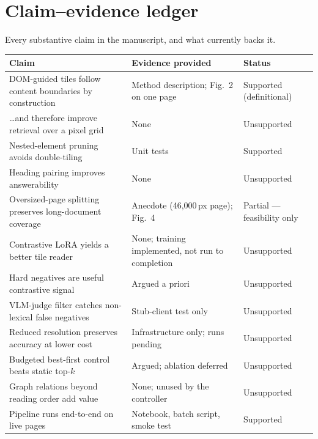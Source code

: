 \documentclass[11pt,a4paper]{article}
\begin{document}
\section{Claim--evidence ledger}

Every substantive claim in the manuscript, and what currently backs it.

\begin{center}
\small
\begin{longtable}{@{}L{7.1cm}L{4.1cm}L{4.4cm}@{}}
\toprule
\textbf{Claim} & \textbf{Evidence provided} & \textbf{Status} \\
\midrule
\endhead
DOM-guided tiles follow content boundaries by construction & Method description; Fig.~2 on one page & \textcolor{okgreen}{Supported} (definitional) \\
\dots and therefore improve retrieval over a pixel grid & None & \textcolor{blockred}{Unsupported} \\
Nested-element pruning avoids double-tiling & Unit tests & \textcolor{okgreen}{Supported} \\
Heading pairing improves answerability & None & \textcolor{blockred}{Unsupported} \\
Oversized-page splitting preserves long-document coverage & Anecdote (46{,}000\,px page); Fig.~4 & \textcolor{majororange}{Partial} --- feasibility only \\
Contrastive LoRA yields a better tile reader & None; training implemented, not run to completion & \textcolor{blockred}{Unsupported} \\
Hard negatives are useful contrastive signal & Argued a priori & \textcolor{blockred}{Unsupported} \\
VLM-judge filter catches non-lexical false negatives & Stub-client test only & \textcolor{blockred}{Unsupported} \\
Reduced resolution preserves accuracy at lower cost & Infrastructure only; runs pending & \textcolor{blockred}{Unsupported} \\
Budgeted best-first control beats static top-$k$ & Argued; ablation deferred & \textcolor{blockred}{Unsupported} \\
Graph relations beyond reading order add value & None; unused by the controller & \textcolor{blockred}{Unsupported} \\
Pipeline runs end-to-end on live pages & Notebook, batch script, smoke test & \textcolor{okgreen}{Supported} \\
\bottomrule
\end{longtable}
\end{center}
\end{document}
